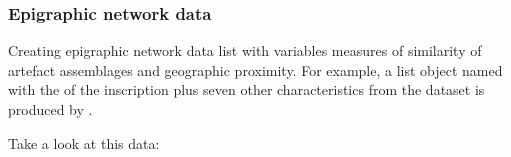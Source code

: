\documentclass[a4paper,12pt,english]{sphinxhowto}
\begin{document}
\subsubsection{Epigraphic network data}
\label{\detokenize{EpigraphicNetwork:epigraphic-network-data}}
Creating epigraphic network data list with variables measures of similarity of artefact assemblages and geographic proximity.
For example, a list object named  with the  of the inscription plus seven other characteristics from
the  dataset is produced by .

\begin{sphinxVerbatim}[commandchars=\\\{\},formatcom=\footnotesize]
       
                      
\end{sphinxVerbatim}


Take a look at this data:
\end{document}
